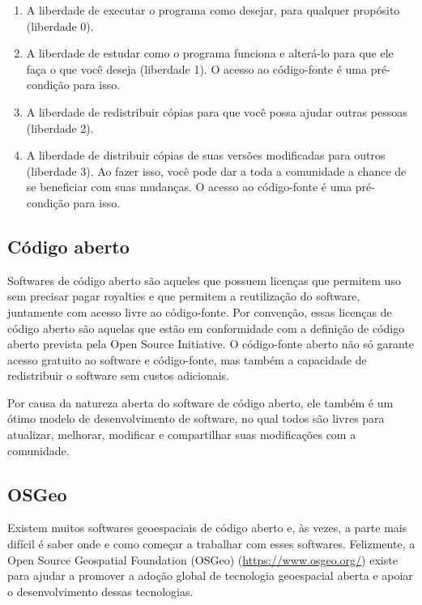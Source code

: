 \documentclass[
  portuguese,
]{krantz}
\providecommand{\tightlist}{%
  \setlength{\itemsep}{0pt}\setlength{\parskip}{0pt}}
\begin{document}
\begin{enumerate}
\def\labelenumi{\arabic{enumi}.}
\tightlist
\item
  A liberdade de executar o programa como desejar, para qualquer propósito (liberdade 0).
\item
  A liberdade de estudar como o programa funciona e alterá-lo para que ele faça o que você deseja (liberdade 1). O acesso ao código-fonte é uma pré-condição para isso.
\item
  A liberdade de redistribuir cópias para que você possa ajudar outras pessoas (liberdade 2).
\item
  A liberdade de distribuir cópias de suas versões modificadas para outros (liberdade 3). Ao fazer isso, você pode dar a toda a comunidade a chance de se beneficiar com suas mudanças. O acesso ao código-fonte é uma pré-condição para isso.
\end{enumerate}

\hypertarget{cuxf3digo-aberto}{%
\subsection{Código aberto}\label{cuxf3digo-aberto}}

Softwares de código aberto são aqueles que possuem licenças que permitem uso sem precisar pagar royalties e que permitem a reutilização do software, juntamente com acesso livre ao código-fonte. Por convenção, essas licenças de código aberto são aquelas que estão em conformidade com a definição de código aberto prevista pela Open Source Initiative. O código-fonte aberto não só garante acesso gratuito ao software e código-fonte, mas também a capacidade de redistribuir o software sem custos adicionais.

Por causa da natureza aberta do software de código aberto, ele também é um ótimo modelo de desenvolvimento de software, no qual todos são livres para atualizar, melhorar, modificar e compartilhar suas modificações com a comunidade.

\hypertarget{osgeo}{%
\subsection{OSGeo}\label{osgeo}}

Existem muitos softwares geoespaciais de código aberto e, às vezes, a parte mais difícil é saber onde e como começar a trabalhar com esses softwares. Felizmente, a Open Source Geospatial Foundation (OSGeo) (\url{https://www.osgeo.org/}) existe para ajudar a promover a adoção global de tecnologia geoespacial aberta e apoiar o desenvolvimento dessas tecnologias.
\end{document}
